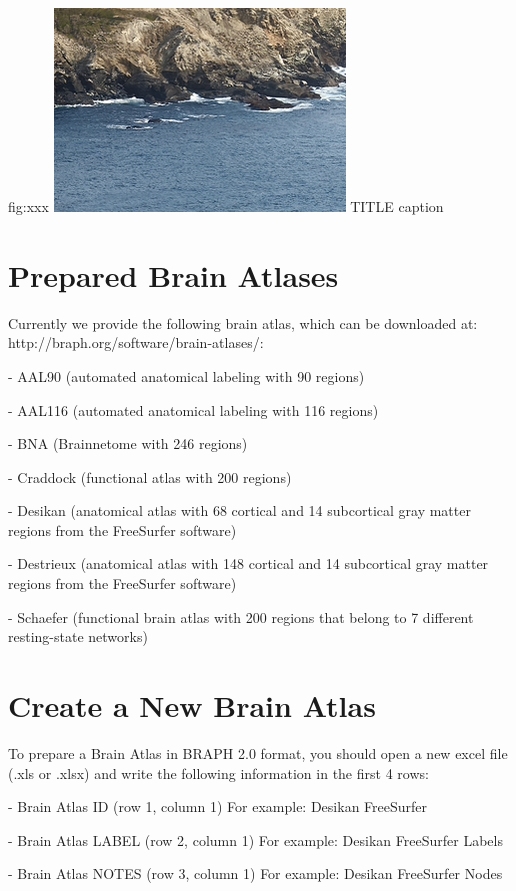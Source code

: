 \documentclass{tufte-handout}
\begin{document}
	{fig:xxx}
	{\includegraphics{tut_ba/fig1.png}}
	{TITLE}
	{
	caption
	}


\clearpage
\section{Prepared Brain Atlases}

Currently we provide the following brain atlas, which can be downloaded at: http://braph.org/software/brain-atlases/:


- AAL90 (automated anatomical labeling with 90 regions)


- AAL116 (automated anatomical labeling with 116 regions)


- BNA (Brainnetome with 246 regions)


- Craddock (functional atlas with 200 regions)


- Desikan (anatomical atlas with 68 cortical and 14 subcortical gray matter regions from the FreeSurfer software)


-  Destrieux (anatomical atlas with 148 cortical and 14 subcortical gray matter regions from the FreeSurfer software)


- Schaefer (functional brain atlas with 200 regions that belong to 7 different resting-state networks)


\section{Create a New Brain Atlas}

To prepare a Brain Atlas in BRAPH 2.0 format, you should open a new excel file (.xls or .xlsx) and write the following information in the first 4 rows:

- Brain Atlas ID (row 1, column 1)
For example: Desikan FreeSurfer


- Brain Atlas LABEL (row 2, column 1)
For example: Desikan FreeSurfer Labels


- Brain Atlas NOTES (row 3, column 1)
For example: Desikan FreeSurfer Nodes
\end{document}
